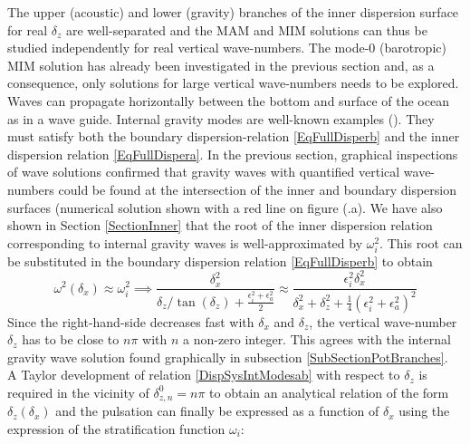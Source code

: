 \documentclass[a4paper,11pt]{article}
\begin{document}
The upper (acoustic) and lower (gravity) branches of the inner dispersion surface for real $\delta_z$ are well-separated and the MAM and MIM solutions can thus be studied independently for real vertical wave-numbers. The mode-0 (barotropic) MIM solution has already been investigated in the previous section and, as a consequence, only solutions for large vertical wave-numbers needs to be explored.\\
Waves can propagate horizontally between the bottom and surface of the ocean as in a wave guide. Internal gravity modes are well-known examples (\cite{gill_1982}). They must satisfy both the boundary dispersion-relation \ref{EqFullDisperb} and the inner dispersion relation \ref{EqFullDispera}. In the previous section, graphical inspections of wave solutions confirmed that gravity waves with quantified vertical wave-numbers could be found at the intersection of the inner and boundary dispersion surfaces (numerical solution shown with a red line on figure (.a).
We have also shown in Section \ref{SectionInner} that the root of the inner dispersion relation corresponding to internal gravity waves is well-approximated by $\omega_i^2$. This root can be substituted in the boundary dispersion relation \ref{EqFullDisperb} to obtain
\begin{equation}
	   \label{DispSysIntModesab}
		\omega^2(\delta_x) \approx\omega_i^2\implies
		\frac{\delta_x^2}
		{\delta_z/\tan(\delta_z)+\frac{\epsilon_i^2+\epsilon_a^2}{2}}
		\approx
		\frac{\epsilon_i^2 \delta_x^2}{\delta_x^2
		+\delta_z^2+\frac{1}{4}\left(
		\epsilon_i^2+\epsilon_a^2\right)^2}
\end{equation}
Since the right-hand-side decreases fast with $\delta_x$ and $\delta_z$, the vertical wave-number $\delta_z$ has to be close to $n\pi$ with $n$ a non-zero integer. This agrees with the internal gravity wave solution found graphically in subsection \ref{SubSectionPotBranches}.\\
A Taylor development of relation \ref{DispSysIntModesab} with respect to $\delta_z$ is required in the vicinity of $\delta_{z,n}^0=n\pi$ to obtain an analytical relation of the form $\delta_z(\delta_x)$ and the pulsation can finally be expressed as a function of $\delta_x$ using the expression of the stratification function $\omega_i$:
\end{document}

